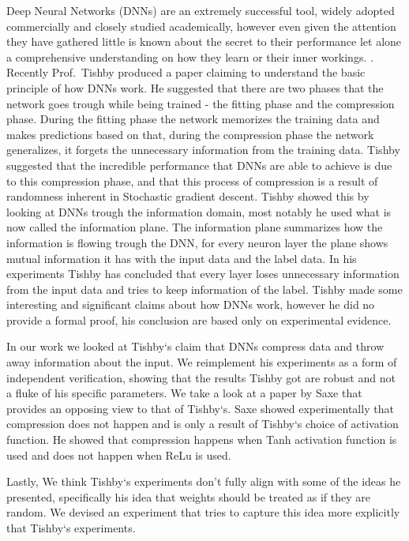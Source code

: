 Deep Neural Networks (DNNs) are an extremely successful tool, widely adopted
commercially and closely studied academically, however even given the attention
they have gathered little is known about the secret to their performance let
alone a comprehensive understanding on how they learn or their inner workings.
. Recently Prof.\ Tishby produced a paper claiming to understand the basic
principle of how DNNs work. He suggested that there are two phases that the
network goes trough while being trained - the fitting phase and the compression
phase. During the fitting phase the network memorizes the training data and
makes predictions based on that, during the compression phase the network
generalizes, it forgets the unnecessary information from the training data.
Tishby suggested that the incredible performance that DNNs are able to achieve
is due to this compression phase, and that this process of compression is a
result of randomness inherent in Stochastic gradient descent. Tishby showed this
by looking at DNNs trough the information domain, most notably he used what is
now called the information plane. The information plane summarizes how the
information is flowing trough the DNN, for every neuron layer the plane shows
mutual information it has with the input data and the label data. In his
experiments Tishby has concluded that every layer loses unnecessary information
from the input data and tries to keep information of the label.
Tishby made some interesting and significant claims about how DNNs work, however
he did no provide a formal proof, his conclusion are based only on experimental
evidence. 

In our work we looked at Tishby`s claim that DNNs compress data and throw away
information about the input. We reimplement his experiments as a form of
independent verification, showing that the results Tishby got are robust and not
a fluke of his specific parameters. We take a look at a paper by Saxe that
provides an opposing view to that of Tishby`s. Saxe showed experimentally that
compression does not happen and is only a result of Tishby`s choice of
activation function. He showed that compression happens when Tanh activation
function is used and does not happen when ReLu is used.

Lastly, We think Tishby`s experiments don't fully align with some of the ideas
he presented, specifically his idea that weights should be treated as if they
are random. We devised an experiment that tries to capture this idea more
explicitly that Tishby`s experiments.
